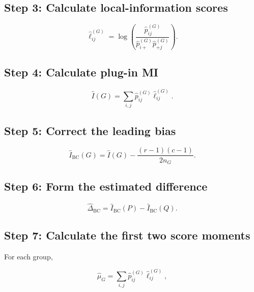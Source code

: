 \documentclass[
  11pt]{article}
\begin{document}
\subsection{Step 3: Calculate local-information
scores}\label{step-3-calculate-local-information-scores}

\begin{equation}
\widehat\ell^{(G)}_{ij}
=\log\left(
\frac{\widehat p^{(G)}_{ij}}
{\widehat p^{(G)}_{i+}\widehat p^{(G)}_{+j}}
\right).
\end{equation}

\subsection{Step 4: Calculate plug-in
MI}\label{step-4-calculate-plug-in-mi}

\begin{equation}
\widehat I(G)
=\sum_{i,j}\widehat p^{(G)}_{ij}
\widehat\ell^{(G)}_{ij}.
\end{equation}

\subsection{Step 5: Correct the leading
bias}\label{step-5-correct-the-leading-bias}

\begin{equation}
\widehat I_{\mathrm{BC}}(G)
=\widehat I(G)-\frac{(r-1)(c-1)}{2n_G}.
\end{equation}

\subsection{Step 6: Form the estimated
difference}\label{step-6-form-the-estimated-difference}

\begin{equation}
\widehat\Delta_{\mathrm{BC}}
=\widehat I_{\mathrm{BC}}(P)
-\widehat I_{\mathrm{BC}}(Q).
\end{equation}

\subsection{Step 7: Calculate the first two score
moments}\label{step-7-calculate-the-first-two-score-moments}

For each group,

\begin{equation}
\widehat\mu_G
=\sum_{i,j}\widehat p^{(G)}_{ij}
\widehat\ell^{(G)}_{ij},
\end{equation}
\end{document}

